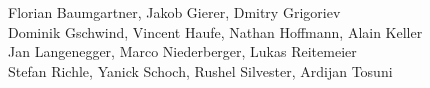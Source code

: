 %
%
%
Florian Baumgartner,	%
Jakob Gierer,		%
Dmitry Grigoriev%
\\
Dominik Gschwind,	%
Vincent Haufe,		%
Nathan Hoffmann,	%
Alain Keller%
\\
Jan Langenegger,	%
Marco Niederberger,	%
Lukas Reitemeier%
\\
Stefan Richle,		%
Yanick Schoch,		%
Rushel Silvester,
Ardijan Tosuni%
